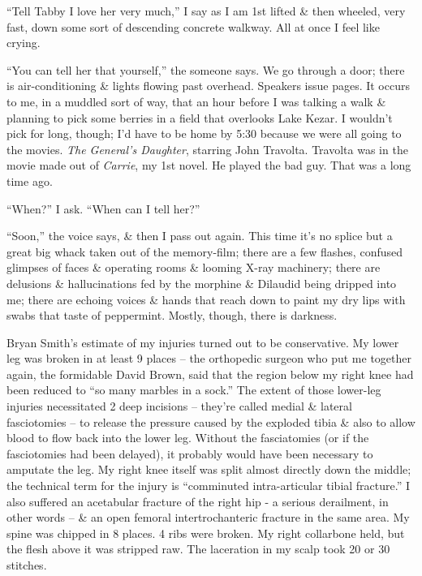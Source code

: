 \documentclass{article}
\numberwithin{equation}{section}
\begin{document}
``Tell Tabby I love her very much,'' I say as I am 1st lifted \& then wheeled, very fast, down some sort of descending concrete walkway. All at once I feel like crying.

``You can tell her that yourself,'' the someone says. We go through a door; there is air-conditioning \& lights flowing past overhead. Speakers issue pages. It occurs to me, in a muddled sort of way, that an hour before I was talking a walk \& planning to pick some berries in a field that overlooks Lake Kezar. I wouldn't pick for long, though; I'd have to be home by 5:30 because we were all going to the movies. \textit{The General's Daughter}, starring John Travolta. Travolta was in the movie made out of \textit{Carrie}, my 1st novel. He played the bad guy. That was a long time ago.

``When?'' I ask. ``When can I tell her?''

``Soon,'' the voice says, \& then I pass out again. This time it's no splice but a great big whack taken out of the memory-film; there are a few flashes, confused glimpses of faces \& operating rooms \& looming X-ray machinery; there are delusions \& hallucinations fed by the morphine \& Dilaudid being dripped into me; there are echoing voices \& hands that reach down to paint my dry lips with swabs that taste of peppermint. Mostly, though, there is darkness.

 Bryan Smith's estimate of my injuries turned out to be conservative. My lower leg was broken in at least 9 places -- the orthopedic surgeon who put me together again, the formidable David Brown, said that the region below my right knee had been reduced to ``so many marbles in a sock.'' The extent of those lower-leg injuries necessitated 2 deep incisions -- they're called medial \& lateral fasciotomies -- to release the pressure caused by the exploded tibia \& also to allow blood to flow back into the lower leg. Without the fasciatomies (or if the fasciotomies had been delayed), it probably would have been necessary to amputate the leg. My right knee itself was split almost directly down the middle; the technical term for the injury is ``comminuted intra-articular tibial fracture.'' I also suffered an acetabular fracture of the right hip - a serious derailment, in other words -- \& an open femoral intertrochanteric fracture in the same area. My spine was chipped in 8 places. 4 ribs were broken. My right collarbone held, but the flesh above it was stripped raw. The laceration in my scalp took 20 or 30 stitches.
\end{document}
